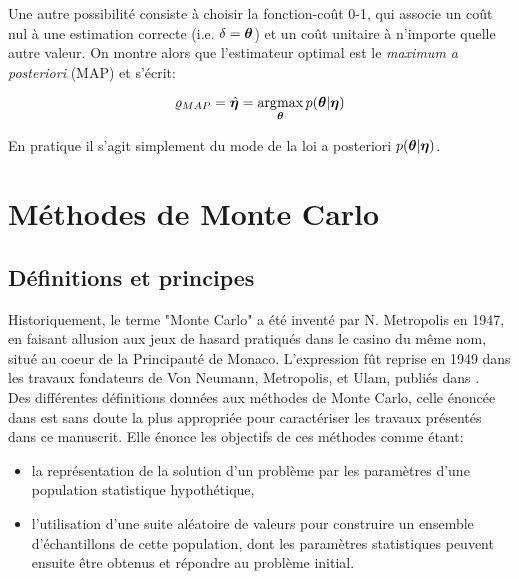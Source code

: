 Une autre possibilité consiste à choisir la fonction-coût 0-1, qui associe un coût nul à une estimation correcte (i.e. $\delta = {\bm{\theta}}$) et un coût unitaire à n'importe quelle autre valeur. On montre alors que l'estimateur optimal est le \textit{maximum a posteriori} (MAP) et s'écrit: 

\begin{equation}
	\varrho_{MAP} = \hat{{\bm{\eta}}} = \operatorname*{\arg\!\max}_{{\bm{\theta}}} {p({\bm{\theta}} | {\bm{\eta}})}
	\label{eq_definition_map}
\end{equation}

En pratique il s'agit simplement du mode de la loi a posteriori ${p({\bm{\theta}} | {\bm{\eta}})}$.\\



\section{Méthodes de Monte Carlo}

\subsection{Définitions et principes}

Historiquement, le terme "Monte Carlo" a été inventé par N. Metropolis en 1947, en faisant allusion aux jeux de hasard pratiqués dans le casino du même nom, situé au coeur de la Principauté de Monaco. L'expression fût reprise en 1949 dans les travaux fondateurs de Von Neumann, Metropolis, et Ulam, publiés dans \cite{Metropolis1949}.\\

Des différentes définitions données aux méthodes de Monte Carlo, celle énoncée dans \cite{Halton1970} est sans doute la plus appropriée pour caractériser les travaux présentés dans ce manuscrit. Elle énonce les objectifs de ces méthodes comme étant: \\

\begin{itemize}
	\item la représentation de la solution d'un problème par les paramètres d'une population statistique hypothétique,
	\item l'utilisation d'une suite aléatoire de valeurs pour construire un ensemble d'échantillons de cette population, dont les paramètres statistiques peuvent ensuite être obtenus et répondre au problème initial.\\
\end{itemize}

